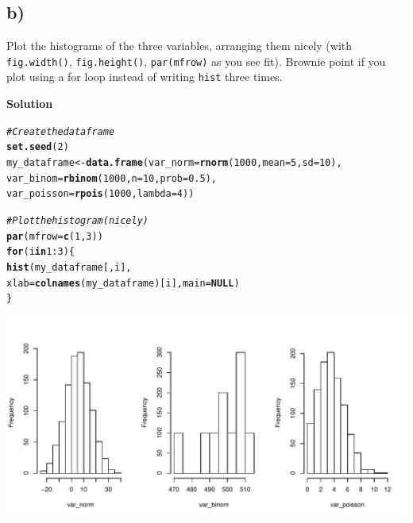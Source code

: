 \documentclass{article}\usepackage[]{graphicx}\usepackage[]{color}
\makeatletter
\def\maxwidth{ %
  \ifdim\Gin@nat@width>\linewidth
    \linewidth
  \else
    \Gin@nat@width
  \fi
}
\newcommand{\hlnum}[1]{\textcolor[rgb]{0.686,0.059,0.569}{#1}}%
\newcommand{\hlcom}[1]{\textcolor[rgb]{0.678,0.584,0.686}{\textit{#1}}}%
\newcommand{\hlopt}[1]{\textcolor[rgb]{0,0,0}{#1}}%
\newcommand{\hlstd}[1]{\textcolor[rgb]{0.345,0.345,0.345}{#1}}%
\newcommand{\hlkwa}[1]{\textcolor[rgb]{0.161,0.373,0.58}{\textbf{#1}}}%
\newcommand{\hlkwb}[1]{\textcolor[rgb]{0.69,0.353,0.396}{#1}}%
\newcommand{\hlkwc}[1]{\textcolor[rgb]{0.333,0.667,0.333}{#1}}%
\newcommand{\hlkwd}[1]{\textcolor[rgb]{0.737,0.353,0.396}{\textbf{#1}}}%
\newenvironment{kframe}{%
 \def\at@end@of@kframe{}%
 \ifinner\ifhmode%
  \def\at@end@of@kframe{\end{minipage}}%
  \begin{minipage}{\columnwidth}%
 \fi\fi%
 \def\FrameCommand##1{\hskip\@totalleftmargin \hskip-\fboxsep
 \colorbox{shadecolor}{##1}\hskip-\fboxsep
     \hskip-\linewidth \hskip-\@totalleftmargin \hskip\columnwidth}%
 \MakeFramed {\advance\hsize-\width
   \@totalleftmargin\z@ \linewidth\hsize
   \@setminipage}}%
 {\par\unskip\endMakeFramed%
 \at@end@of@kframe}
\newenvironment{knitrout}{}{} %
\makeatother
\begin{document}
\subsection*{b)}

Plot the histograms of the three variables, arranging them nicely (with \verb`fig.width()`, \verb`fig.height()`, \verb`par(mfrow)` as you see fit). Brownie point if you plot using a for loop instead of writing \verb`hist` three times.

\textbf{Solution}

\begin{knitrout}
\color{fgcolor}\begin{kframe}
\begin{alltt}
\hlcom{# Create the data frame}
\hlkwd{set.seed}\hlstd{(}\hlnum{2}\hlstd{)}
\hlstd{my_dataframe} \hlkwb{<-} \hlkwd{data.frame}\hlstd{(}\hlkwc{var_norm} \hlstd{=} \hlkwd{rnorm}\hlstd{(}\hlnum{1000}\hlstd{,} \hlkwc{mean} \hlstd{=} \hlnum{5}\hlstd{,} \hlkwc{sd} \hlstd{=} \hlnum{10}\hlstd{),}
                           \hlkwc{var_binom} \hlstd{=} \hlkwd{rbinom}\hlstd{(}\hlnum{1000}\hlstd{,} \hlkwc{n} \hlstd{=} \hlnum{10}\hlstd{,} \hlkwc{prob} \hlstd{=} \hlnum{0.5}\hlstd{),}
                           \hlkwc{var_poisson} \hlstd{=} \hlkwd{rpois}\hlstd{(}\hlnum{1000}\hlstd{,} \hlkwc{lambda} \hlstd{=} \hlnum{4}\hlstd{))}
\end{alltt}
\end{kframe}
\end{knitrout}

\begin{knitrout}
\color{fgcolor}\begin{kframe}
\begin{alltt}
\hlcom{# Plot the histogram (nicely)}
\hlkwd{par}\hlstd{(}\hlkwc{mfrow} \hlstd{=} \hlkwd{c}\hlstd{(}\hlnum{1}\hlstd{,} \hlnum{3}\hlstd{))}
\hlkwa{for} \hlstd{(i} \hlkwa{in} \hlnum{1}\hlopt{:}\hlnum{3}\hlstd{) \{}
  \hlkwd{hist}\hlstd{(my_dataframe[ , i],}
       \hlkwc{xlab} \hlstd{=} \hlkwd{colnames}\hlstd{(my_dataframe)[i],} \hlkwc{main} \hlstd{=} \hlkwa{NULL}\hlstd{)}
\hlstd{\}}
\end{alltt}
\end{kframe}
\includegraphics[width=\maxwidth]{figure/unnamed-chunk-2-1} 

\end{knitrout}
\end{document}
